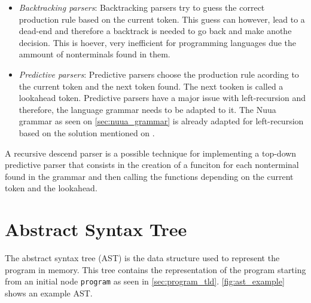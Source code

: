 \begin{itemize}
    \item \emph{Backtracking parsers}: Backtracking parsers try to guess the correct production rule based on the current token. This guess can however, lead to a
        dead-end and therefore a backtrack is needed to go back and make anothe decision. This is hoever, very inefficient for programming languages due the ammount
        of nonterminals found in them.
    \item \emph{Predictive parsers}: Predictive parsers choose the production rule acording to the current token and the next token found. The next tooken is called
        a lookahead token. Predictive parsers have a major issue with left-recursion and therefore, the language grammar needs to be adapted to it.
        The Nuua grammar as seen on \autoref{sec:nuua_grammar} is already adapted for left-recursion based on the solution mentioned on
        \autocite[Section~6]{crafting_interpreters}.
\end{itemize}

A recursive descend parser is a possible technique for implementing a top-down predictive parser that consists in the creation of a funciton for each
nonterminal found in the grammar and then calling the functions depending on the current token and the lookahead.

\section{Abstract Syntax Tree}

The abstract syntax tree (AST) is the data structure used to represent the program in memory. This tree contains the
representation of the program starting from an initial node \texttt{program} as seen in \autoref{sec:program_tld}.
\autoref{fig:ast_example} shows an example AST.

